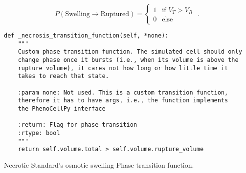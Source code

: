 \begin{equation}\label{eq:necro-swell:transition}
    P(\text{Swelling}\rightarrow\text{Ruptured}) = \begin{cases} 1 & \text{if }V_T > V_R\\
    0 & \text{else}
    \end{cases}\,\,.
\end{equation}


\begin{listing}[!htpb]
\begin{verbatim}
def _necrosis_transition_function(self, *none):
    """
    Custom phase transition function. The simulated cell should only 
    change phase once it bursts (i.e., when its volume is above the
    rupture volume), it cares not how long or how little time it 
    takes to reach that state.
    
    :param none: Not used. This is a custom transition function, 
    therefore it has to have args, i.e., the function implements 
    the PhenoCellPy interface
    
    :return: Flag for phase transition
    :rtype: bool
    """
    return self.volume.total > self.volume.rupture_volume
\end{verbatim}
\caption{Necrotic Standard's osmotic swelling Phase transition function.}\label{code:necro:trans}
\end{listing}

